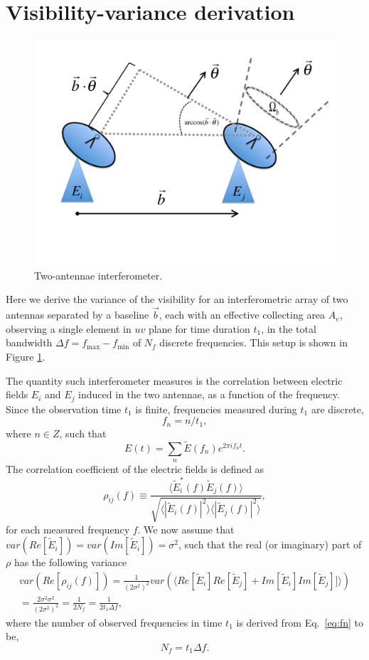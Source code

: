 \documentclass[12pt]{paper}
\newcommand{\beq}{\begin{equation}}
\newcommand{\eeq}{\end{equation}}
\newcommand{\bga}{\begin{gathered}}
\newcommand{\ega}{\end{gathered}}
\begin{document}
\appendix
\section{Visibility-variance derivation}
\label{app_Vrms}

\begin{figure}
\centering
\includegraphics[width=.5\textwidth,keepaspectratio=true]{2antennae.pdf}
\caption{Two-antennae interferometer.\label{fig:2antennae}}
\end{figure}

Here we derive the variance of the visibility for an interferometric array of two antennas separated by a baseline $\vec{b}$, each with an effective collecting area $A_e$, observing a single element in $uv$ plane for time duration $t_1$, in the total bandwidth $\Delta f = f_\text{max}-f_\text{min}$ of $N_f$ discrete frequencies. This setup is shown in Figure \ref{fig:2antennae}.

The quantity such interferometer measures is the correlation between electric fields $E_i$ and $E_j$ induced in the two antennae, as a function of the frequency. Since the observation time $t_1$ is finite, frequencies measured during $t_1$ are discrete, 
\beq
f_n = n/t_1, 
\label{eq:fn}
\eeq
where $n\in Z$, such that
\beq
E(t) = \sum_{n}\widetilde{E}(f_n)e^{2\pi if_nt}.
\eeq
The correlation coefficient of the electric fields is defined as
\beq
\rho_{ij}(f) \equiv \frac{\langle \widetilde{E}^*_i(f)\widetilde E_j(f)\rangle}{\sqrt{\langle |\widetilde{E}_i(f)|^2\rangle\langle|\widetilde E_j(f)|^2\rangle}},
\label{eq:rho_ij}
\eeq
for each measured frequency $f$. We now assume that $var(Re[ \widetilde E_i])=var(Im[\widetilde E_i])=\sigma^2$, such that the real (or imaginary) part of $\rho$ has the following variance
\beq
\bga
var(Re[\rho_{ij}(f)]) = \frac{1}{(2\sigma^2)^2}var(\langle Re[\widetilde{E}_i]Re[\widetilde{E}_j] + Im[\widetilde{E}_i]Im[\widetilde{E}_j]]\rangle) \\
= \frac{2\sigma^2\sigma^2}{(2\sigma^2)^2} = \frac{1}{2N_f} = \frac{1}{2t_1\Delta f},
\ega
\label{eq:var_Rerho}
\eeq
where the number of observed frequencies in time $t_1$ is derived from Eq.~\ref{eq:fn} to be,
\beq
N_f =  t_1\Delta f.
\label{eq:Nf}
\eeq
\end{document}
